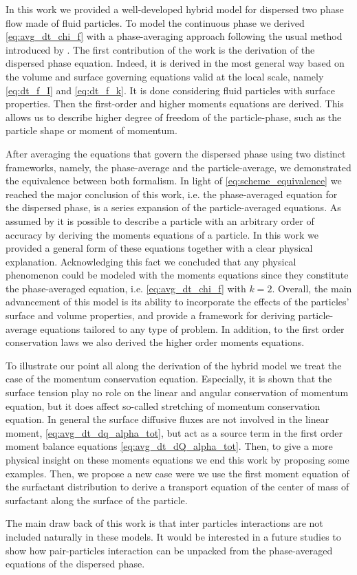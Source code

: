 In this work we provided a well-developed hybrid model for dispersed two phase flow made of fluid particles.
To model the continuous phase we derived \ref{eq:avg_dt_chi_f} with a phase-averaging approach following the usual method introduced by \citet{drew1983mathematical}.
The first contribution of the work is the derivation of the dispersed phase equation. 
Indeed, it is derived in the most general way based on the volume and surface governing equations valid at the local scale, namely \ref{eq:dt_f_I} and \ref{eq:dt_f_k}. 
It is done considering fluid particles with surface properties. 
Then the first-order and higher moments equations are derived.
This allows us to describe higher degree of freedom of the particle-phase, such as the particle shape or moment of momentum. 

After averaging the equations that govern the dispersed phase using two distinct frameworks, namely, the phase-average and the particle-average, we demonstrated the equivalence between both formalism. 
In light of \ref{eq:scheme_equivalence} we reached the major conclusion of this work, i.e.  the phase-averaged equation for the dispersed phase, is a series expansion of the particle-averaged equations.  
As assumed by \citet{zhang1997momentum} it is possible to describe a particle with an arbitrary order of accuracy by deriving the moments equations of a particle. 
In this work we provided a general form of these equations together with a clear physical explanation. 
Acknowledging this fact we concluded that  any physical phenomenon could be modeled with the moments equations since they constitute the phase-averaged equation, i.e. \ref{eq:avg_dt_chi_f} with $k =2$. 
Overall, the main advancement of this model is its ability to incorporate the effects of the particles' surface and volume properties, and provide a framework for deriving particle-average equations tailored to any type of problem.
In addition, to the first order conservation laws we also derived the higher order moments equations. 

To illustrate our point all along the derivation of the hybrid model we treat the case of the momentum conservation equation. 
Especially, it is shown that the surface tension play no role on the linear and angular conservation of momentum equation, but it does  affect so-called stretching of momentum conservation equation. 
In general the surface diffusive fluxes are not involved in the linear moment, \ref{eq:avg_dt_dq_alpha_tot}, but act as a source term in the first order moment balance equations \ref{eq:avg_dt_dQ_alpha_tot}. 
Then, to give a more physical insight on these moments equations we end this work by proposing some examples. 
Then, we propose a new case were we use the first moment equation of the surfactant distribution to derive a transport equation of the center of mass of surfactant along the surface of the particle. 

The main draw back of this work is that inter particles interactions are not included naturally in these models. 
It would be interested in a future studies to show how pair-particles interaction can be unpacked from the phase-averaged equations of the dispersed phase. 

